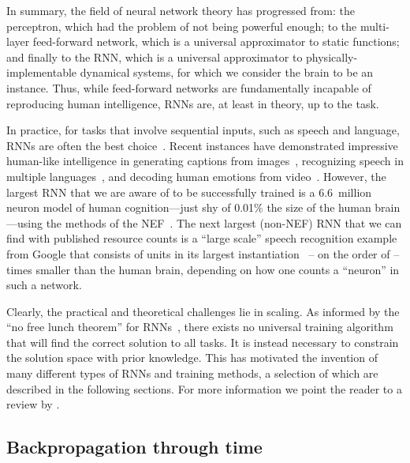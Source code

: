In summary, the field of neural network theory has progressed from: the perceptron, which had the problem of not being powerful enough; to the multi-layer feed-forward network, which is a universal approximator to static functions; and finally to the RNN, which is a universal approximator to physically-implementable dynamical systems, for which we consider the brain to be an instance.
Thus, while feed-forward networks are fundamentally incapable of reproducing human intelligence, RNNs are, at least in theory, up to the task.

In practice, for tasks that involve sequential inputs, such as speech and language, RNNs are often the best choice~\citep{lecun2015deep}.
Recent instances have demonstrated impressive human-like intelligence in generating captions from images~\citep{vinyals2015show}, recognizing speech in multiple languages~\citep{amodei2016deep}, and decoding human emotions from video~\citep{ebrahimi2015recurrent}.
However, the largest RNN that we are aware of to be successfully trained is a 6.6~million neuron model of human cognition---just shy of 0.01\% the size of the human brain---using the methods of the NEF~\citep{choo2018}.
The next largest (non-NEF) RNN that we can find with published resource counts is a ``large scale'' speech recognition example from Google that consists of  units in its largest instantiation~\citep[][Table~1]{sak2014long} -- on the order of -- times smaller than the human brain, depending on how one counts a ``neuron'' in such a network.

Clearly, the practical and theoretical challenges lie in scaling.
As informed by the ``no free lunch theorem'' for RNNs~\citep{wiklicky1994non}, there exists no universal training algorithm that will find the correct solution to all tasks.
It is instead necessary to constrain the solution space with prior knowledge.
This has motivated the invention of many different types of RNNs and training methods, a selection of which are described in the following sections.
For more information we point the reader to a review by \citet{salehinejad2017recent}.

\subsection{Backpropagation through time}
\label{sec:bptt}

